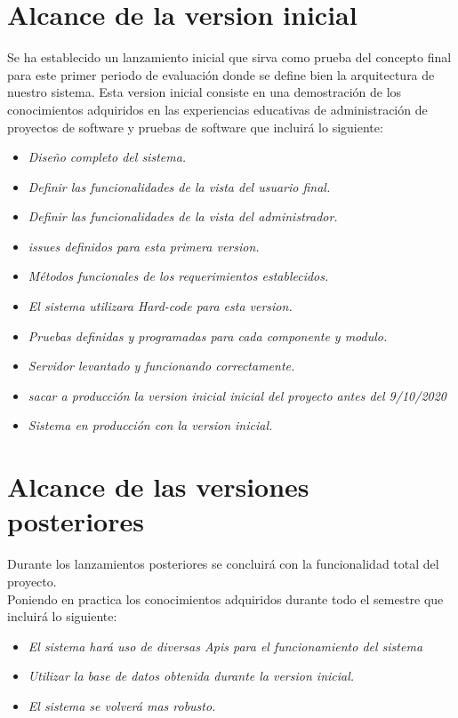 \documentclass[12pt,a4paper]{book}
\begin{document}
\section{Alcance de la version inicial}
\vspace{0.5 cm}
Se ha establecido un lanzamiento inicial que sirva como prueba del concepto final para este primer periodo de evaluación donde se define bien la arquitectura de nuestro sistema.
Esta version inicial consiste en una demostración de los conocimientos adquiridos en las experiencias educativas de administración de proyectos de software y pruebas de software que incluirá lo siguiente: \\
\vspace{0.5 cm}
\begin{itemize}
\item \textit{Diseño completo del sistema.}
\item \textit{Definir las funcionalidades de la vista del usuario final.}
\item \textit{Definir las funcionalidades de la vista del administrador.}
\item \textit{issues definidos para esta primera version.}
\item \textit{Métodos funcionales de los requerimientos establecidos.}
\item \textit{El sistema utilizara Hard-code para esta version.}
\item \textit{Pruebas definidas y programadas para cada componente y modulo.}
\item \textit{Servidor levantado y funcionando correctamente.}
\item \textit{sacar a producción la version inicial inicial del proyecto antes del 9/10/2020}
\item \textit{Sistema en producción con la version inicial.}
\end{itemize} 
\newpage
\section{Alcance de las versiones posteriores}
\vspace{0.5 cm}
Durante los lanzamientos posteriores se concluirá con la funcionalidad total del proyecto.\\
Poniendo en practica los conocimientos adquiridos durante todo el semestre que incluirá lo siguiente: \\
\begin{itemize}
\item \textit{El sistema hará uso de diversas Apis para el funcionamiento del sistema}
\item \textit{Utilizar la base de datos obtenida durante la version inicial.}
\item \textit{El sistema se volverá mas robusto.}
\end{itemize} 
\newpage
\end{document}
